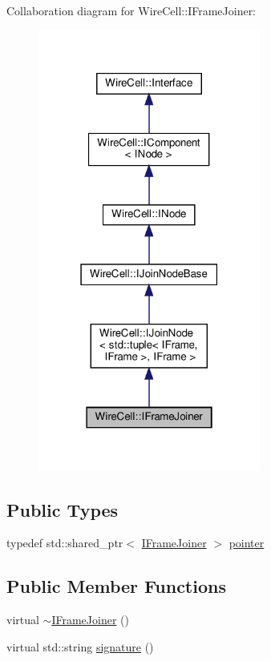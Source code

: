 Collaboration diagram for Wire\+Cell\+:\+:I\+Frame\+Joiner\+:
\nopagebreak
\begin{figure}[H]
\begin{center}
\leavevmode
\includegraphics[width=207pt]{class_wire_cell_1_1_i_frame_joiner__coll__graph}
\end{center}
\end{figure}
\subsection*{Public Types}
\begin{DoxyCompactItemize}
\item 
typedef std\+::shared\+\_\+ptr$<$ \hyperlink{class_wire_cell_1_1_i_frame_joiner}{I\+Frame\+Joiner} $>$ \hyperlink{class_wire_cell_1_1_i_frame_joiner_a2a16f627f08fd104f0c58e6f174944e1}{pointer}
\end{DoxyCompactItemize}
\subsection*{Public Member Functions}
\begin{DoxyCompactItemize}
\item 
virtual \hyperlink{class_wire_cell_1_1_i_frame_joiner_a4f0e53fda2faab6d19a90fa580230820}{$\sim$\+I\+Frame\+Joiner} ()
\item 
virtual std\+::string \hyperlink{class_wire_cell_1_1_i_frame_joiner_a20082c7707a433faef85496553e7c7c1}{signature} ()
\end{DoxyCompactItemize}


